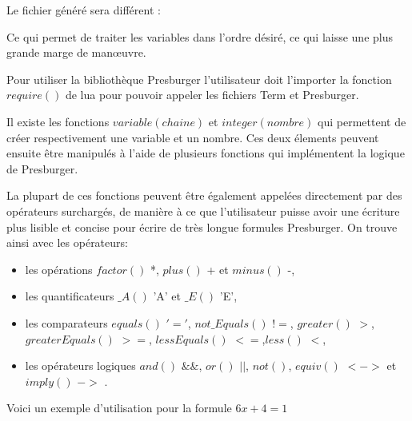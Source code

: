 Le fichier généré sera différent : \vspace{0.5cm}


Ce qui permet de traiter les variables dans l'ordre désiré, ce qui laisse une plus grande marge de man\oe{}uvre.\\\par

Pour utiliser la bibliothèque Presburger l'utilisateur doit l'importer la fonction $require()$ de lua pour pouvoir appeler les fichiers Term et Presburger.\\\par

Il existe les fonctions $variable(chaine)$ et $integer(nombre)$ qui permettent de créer respectivement une variable et un nombre. Ces deux élements peuvent ensuite être manipulés à l'aide de plusieurs fonctions qui implémentent la logique de Presburger.\\\par

La plupart de ces fonctions peuvent être également appelées directement par des opérateurs surchargés, de manière à ce que l'utilisateur puisse avoir une écriture plus lisible et concise pour écrire de très longue formules Presburger. On trouve ainsi avec les opérateurs:
\begin{itemize}
 \item les opérations $factor()$ *, $plus()$ + et $minus()$ -,
 \item les quantificateurs $\_A()$ 'A' et $\_E()$ 'E',
 \item les comparateurs $equals()$ $'='$, $not\_Equals()$ $!=$, $greater()$ $>$,\\$greaterEquals()$ $>=$, $lessEquals()$ $<=$,$less()$ $<$,
 \item les opérateurs logiques $and()$ $\&\&$, $or()$ $||$, $not()$, $equiv()$ $<->$  et $imply()$ $->$ .
\end{itemize}
Voici un exemple d'utilisation pour la formule $6x + 4 = 1$\\
 
